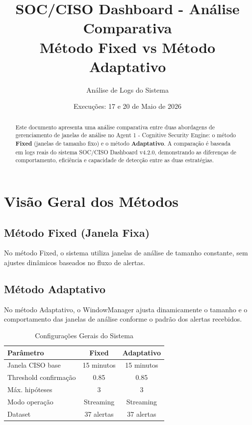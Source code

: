 \documentclass[10pt,a4paper]{article}
\title{\textbf{SOC/CISO Dashboard - Análise Comparativa}\\ \large Método Fixed vs Método Adaptativo}
\author{Análise de Logs do Sistema}
\date{Execuções: 17 e 20 de Maio de 2026}
\begin{document}
\maketitle

\begin{abstract}
Este documento apresenta uma análise comparativa entre duas abordagens de gerenciamento de janelas de análise no Agent 1 - Cognitive Security Engine: o método \textbf{Fixed} (janelas de tamanho fixo) e o método \textbf{Adaptativo}. A comparação é baseada em logs reais do sistema SOC/CISO Dashboard v4.2.0, demonstrando as diferenças de comportamento, eficiência e capacidade de detecção entre as duas estratégias.
\end{abstract}

\section{Visão Geral dos Métodos}

\subsection{Método Fixed (Janela Fixa)}
No método Fixed, o sistema utiliza janelas de análise de tamanho constante, sem ajustes dinâmicos baseados no fluxo de alertas.

\subsection{Método Adaptativo}
No método Adaptativo, o WindowManager ajusta dinamicamente o tamanho e o comportamento das janelas de análise conforme o padrão dos alertas recebidos.

\begin{table}[h]
\centering
\caption{Configurações Gerais do Sistema}
\begin{tabular}{@{}lcc@{}}
\toprule
\textbf{Parâmetro} & \textbf{Fixed} & \textbf{Adaptativo} \\
\midrule
Janela CISO base & 15 minutos & 15 minutos \\
Threshold confirmação & 0.85 & 0.85 \\
Máx. hipóteses & 3 & 3 \\
Modo operação & Streaming & Streaming \\
Dataset & 37 alertas & 37 alertas \\
\bottomrule
\end{tabular}
\end{table}
\end{document}
